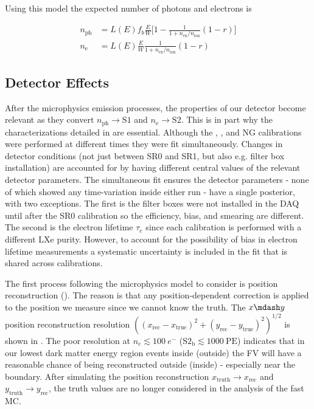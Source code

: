 Using this model the expected number of photons and electrons is

\vspace{-20pt}

\begin{subequations}
\begin{align}
n_{\mathrm{ph}} &= L(E) f_b \frac{E}{W} \Bigg[1 - \frac{1}{1 + n_{\mathrm{ex}}/n_{\mathrm{ion}}} (1 - r) \Bigg] \\[10pt]
n_{\mathrm{e}} &= L(E) \frac{E}{W} \frac{1}{1 + n_{\mathrm{ex}}/n_{\mathrm{ion}}} (1 - r)
\end{align}
\end{subequations}



\subsection{Detector Effects}
\label{subsec:er_nr_calibrations_parameter_determ_det_phys}
After the microphysics emission processes, the properties of our detector become relevant as they convert
$n_{\mathrm{ph}} \rightarrow \mathrm{S1}$ and $n_{\mathrm{e}} \rightarrow \mathrm{S2}$.  This is in part why the
characterizations detailed in  are essential.  Although the , , and NG calibrations
were performed at different times they were fit simultaneously.  Changes in detector conditions (not just between SR0 and SR1, but also e.g.
filter box installation) are accounted for by having different central values of the relevant detector parameters.  The simultaneous fit
ensures the detector parameters - none of which showed any
time-variation inside either run - have a single posterior, with two exceptions.  The first is the filter boxes were not installed in the
DAQ until after the SR0 \ambe calibration so the efficiency, bias, and smearing are different.  The second is the electron lifetime
$\tau_{e}$ since each calibration is performed with a different LXe purity.  However, to account for the possibility of bias in
electron lifetime measurements a systematic uncertainty is included in the fit that is shared across calibrations.

The first process following the microphysics model to consider is position reconstruction
().  The reason is that
any position-dependent correction is applied to the position we measure since we cannot know the truth.  The $x \mdash y$ position
reconstruction resolution $((x_{\mathrm{rec}} - x_{\mathrm{true}})^2 + (y_{\mathrm{rec}} - y_{\mathrm{true}})^2)^{1/2}$ is shown in
.  The poor resolution at
$n_e \lesssim 100\ e^-$ ($\mathrm{S2_b} \lesssim 1000\ \mathrm{PE}$) indicates that in our lowest dark matter energy region events inside
(outside) the FV will have a reasonable chance of being reconstructed outside (inside) - especially near the boundary.  After simulating
the position reconstruction $x_{\mathrm{truth}} \rightarrow x_{\mathrm{rec}}$ and
$y_{\mathrm{truth}} \rightarrow y_{\mathrm{rec}}$, the truth values are no longer considered in the analysis of the fast MC.


